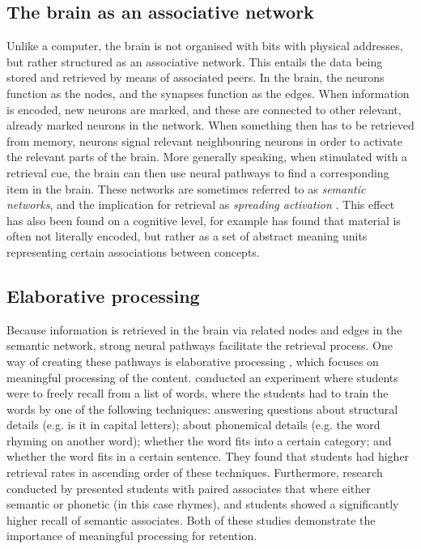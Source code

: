 \subsection{The brain as an associative network}

Unlike a computer, the brain is not organised with bits with physical addresses, but rather structured as an associative network. This entails the data being stored and retrieved by means of associated peers. In the brain, the neurons function as the nodes, and the synapses function as the edges. When information is encoded, new neurons are marked, and these are connected to other relevant, already marked neurons in the network. When something then has to be retrieved from memory, neurons signal relevant neighbouring neurons in order to activate the relevant parts of the brain. More generally speaking, when stimulated with a retrieval cue, the brain can then use neural pathways to find a corresponding item in the brain. These networks are sometimes referred to as \emph{semantic networks}, and the implication for retrieval as \emph{spreading activation} \cite{cognitivepsychology}. This effect has also been found on a cognitive level, for example  has found that material is often not literally encoded, but rather as a set of abstract meaning units representing certain associations between concepts.

\subsection{Elaborative processing}

Because information is retrieved in the brain via related nodes and edges in the semantic network, strong neural pathways facilitate the retrieval process. One way of creating these pathways is elaborative processing \cite{karpicke4, cognitivepsychology}, which focuses on meaningful processing of the content.  conducted an experiment where students were to freely recall from a list of words, where the students had to train the words by one of the following techniques: answering questions about structural details (e.g. is it in capital letters); about phonemical details (e.g. the word rhyming on another word); whether the word fits into a certain category; and whether the word fits in a certain sentence. They found that students had higher retrieval rates in ascending order of these techniques. Furthermore, research conducted by  presented students with paired associates that where either semantic or phonetic (in this case rhymes), and students showed a significantly higher recall of semantic associates. Both of these studies demonstrate the importance of meaningful processing for retention.

